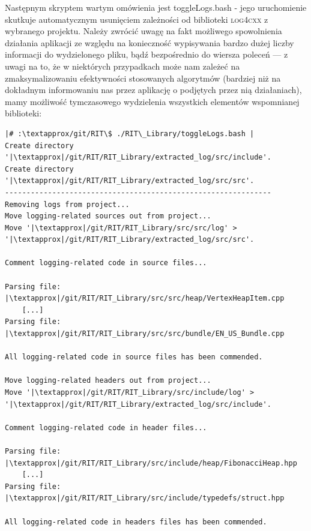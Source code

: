 Następnym skryptem wartym omówienia jest \textsf{toggleLogs.bash} - jego uruchomienie skutkuje automatycznym usunięciem zależności od biblioteki \textsc{log4cxx} z wybranego projektu. Należy zwrócić uwagę na fakt możliwego spowolnienia działania aplikacji ze względu na konieczność wypisywania bardzo dużej liczby informacji do wydzielonego pliku, bądź bezpośrednio do wiersza poleceń --- z uwagi na to, że w niektórych przypadkach może nam zależeć na zmaksymalizowaniu efektywności stosowanych algorytmów (bardziej niż na dokładnym informowaniu nas przez aplikację o podjętych przez nią działaniach), mamy możliwość tymczasowego wydzielenia wszystkich elementów wspomnianej biblioteki:

\begin{verbatim}
|# :\textapprox/git/RIT\$ ./RIT\_Library/toggleLogs.bash |
Create directory '|\textapprox|/git/RIT/RIT_Library/extracted_log/src/include'.
Create directory '|\textapprox|/git/RIT/RIT_Library/extracted_log/src/src'.
--------------------------------------------------------------
Removing logs from project...
Move logging-related sources out from project...
Move '|\textapprox|/git/RIT/RIT_Library/src/src/log' > '|\textapprox|/git/RIT/RIT_Library/extracted_log/src/src'.

Comment logging-related code in source files...

Parsing file: |\textapprox|/git/RIT/RIT_Library/src/src/heap/VertexHeapItem.cpp
	[...]
Parsing file: |\textapprox|/git/RIT/RIT_Library/src/src/bundle/EN_US_Bundle.cpp

All logging-related code in source files has been commended.

Move logging-related headers out from project...
Move '|\textapprox|/git/RIT/RIT_Library/src/include/log' > '|\textapprox|/git/RIT/RIT_Library/extracted_log/src/include'.

Comment logging-related code in header files...

Parsing file: |\textapprox|/git/RIT/RIT_Library/src/include/heap/FibonacciHeap.hpp
	[...]
Parsing file: |\textapprox|/git/RIT/RIT_Library/src/include/typedefs/struct.hpp

All logging-related code in headers files has been commended.
\end{verbatim}


